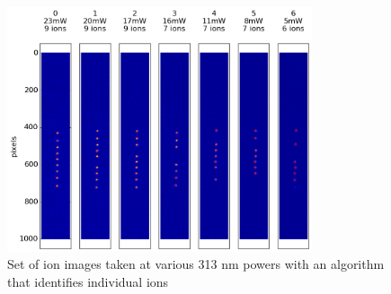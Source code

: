 \begin{figure}[H]
	\centering
	\includegraphics[width=0.8\textwidth]{images/ion_images.png}
	\caption{Set of ion images taken at various 313 nm powers with an algorithm that identifies individual ions}
	\label{fig: ion image set}
\end{figure}

